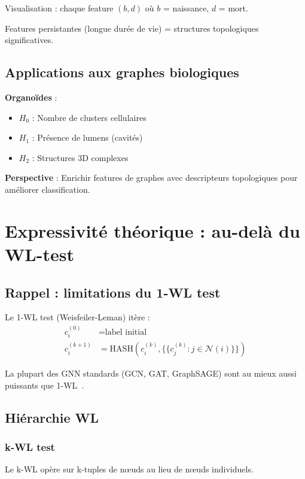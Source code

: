 Visualisation : chaque feature $(b, d)$ où $b$ = naissance, $d$ = mort.

Features persistantes (longue durée de vie) = structures topologiques significatives.

\subsection{Applications aux graphes biologiques}

\textbf{Organoïdes} : 
\begin{itemize}
    \item $H_0$ : Nombre de clusters cellulaires
    \item $H_1$ : Présence de lumens (cavités)
    \item $H_2$ : Structures 3D complexes
\end{itemize}

\textbf{Perspective} : Enrichir features de graphes avec descripteurs topologiques pour améliorer classification.

\section{Expressivité théorique : au-delà du WL-test}

\subsection{Rappel : limitations du 1-WL test}

Le 1-WL test (Weisfeiler-Leman) itère :
\begin{align*}
c_i^{(0)} &= \text{label initial} \\
c_i^{(k+1)} &= \text{HASH}\left(c_i^{(k)}, \{\!\!\{c_j^{(k)} : j \in \mathcal{N}(i)\}\!\!\}\right)
\end{align*}

La plupart des GNN standards (GCN, GAT, GraphSAGE) sont au mieux aussi puissants que 1-WL~\cite{Xu2019}.

\subsection{Hiérarchie WL}

\subsubsection{k-WL test}

Le k-WL opère sur k-tuples de nœuds au lieu de nœuds individuels.

